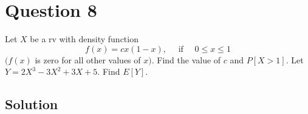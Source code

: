 \section*{Question 8}

Let \( X \) be a rv with density function
\begin{equation*}
    f(x)=c x(1-x), \quad \text { if } \quad 0 \leq x \leq 1
\end{equation*}
\( (f(x) \) is zero for all other values of \( x) \).
Find the value of \( c \) and \( P[X>1] \).
Let \( Y=2 X^{3}-3 X^{2}+3 X+5 \).
Find \( E[Y] \).

\subsection*{Solution}
